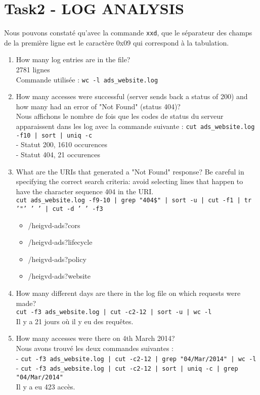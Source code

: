 \documentclass[a4paper,11pt]{article}
\newcounter{commande}[subsection]
\begin{document}
    \section{Task2 - LOG ANALYSIS}
    Nous pouvons constaté qu'avec la commande \texttt{xxd}, que le séparateur des champs de la première ligne est le caractère 0x09 qui correspond à la tabulation.
    \\
    \begin{enumerate}
        \item How many log entries are in the file?\\ 2781 lignes \\Commande utilisée : \texttt{wc -l ads\_website.log}
        \item How many accesses were successful (server sends back a status of 200) and how many had an error of "Not Found" (status 404)?\\
        Nous affichons le nombre de fois que les codes de status du serveur apparaissent dans les log avec la commande suivante : \texttt{cut ads\_website.log -f10 | sort | uniq -c}\\
        - Statut 200, 1610 occurences\\
        - Statut 404, 21 occurences

        \item What are the URIs that generated a "Not Found" response? Be careful in specifying the correct search criteria: avoid selecting lines that happen to have the character sequence 404 in the URI.\\
        \texttt{cut ads\_website.log -f9-10 | grep "404\$" | sort -u | cut -f1 | tr '"' ' ' | cut -d ' ' -f3}
        \begin{itemize}
          \item /heigvd-ads?cors
          \item /heigvd-ads?lifecycle
          \item /heigvd-ads?policy
          \item /heigvd-ads?website
        \end{itemize}

        \item How many different days are there in the log file on which requests were made?\\
        \texttt{cut -f3 ads\_website.log | cut -c2-12 | sort -u | wc -l}\\
        Il y a 21 jours où il y eu des requêtes.

        \item How many accesses were there on 4th March 2014? \\Nous avons trouvé les deux commandes suivantes : \\
        - \texttt{cut -f3 ads\_website.log | cut -c2-12 | grep "04/Mar/2014" | wc -l}\\
        - \texttt{cut -f3 ads\_website.log | cut -c2-12 | sort | uniq -c | grep "04/Mar/2014"}\\
        Il y a eu 423 accès.


\end{enumerate}
\end{document}
